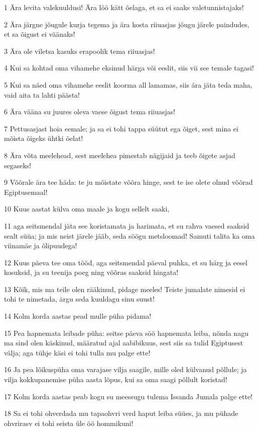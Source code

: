 \par 1 Ära levita valekuuldusi! Ära löö kätt õelaga, et sa ei saaks valetunnistajaks!
\par 2 Ära järgne jõugule kurja tegema ja ära kosta riiuasjas jõugu järele paindudes, et sa õigust ei väänaks!
\par 3 Ära ole viletsa kasuks erapoolik tema riiuasjas!
\par 4 Kui sa kohtad oma vihamehe eksinud härga või eeslit, siis vii see temale tagasi!
\par 5 Kui sa näed oma vihamehe eeslit koorma all lamamas, siis ära jäta teda maha, vaid aita ta lahti päästa!
\par 6 Ära vääna su juures oleva vaese õigust tema riiuasjas!
\par 7 Pettusasjast hoia eemale; ja sa ei tohi tappa süütut ega õiget, sest mina ei mõista õigeks ühtki õelat!
\par 8 Ära võta meelehead, sest meelehea pimestab nägijaid ja teeb õigete asjad segaseks!
\par 9 Võõrale ära tee häda: te ju mõistate võõra hinge, sest te ise olete olnud võõrad Egiptusemaal!
\par 10 Kuus aastat külva oma maale ja kogu sellelt saaki,
\par 11 aga seitsmendal jäta see koristamata ja harimata, et su rahva vaesed saaksid sealt süüa; ja mis neist järele jääb, seda söögu metsloomad! Samuti talita ka oma viinamäe ja õlipuudega!
\par 12 Kuus päeva tee oma tööd, aga seitsmendal päeval puhka, et su härg ja eesel kosuksid, ja su teenija poeg ning võõras saaksid hingata!
\par 13 Kõik, mis ma teile olen rääkinud, pidage meeles! Teiste jumalate nimesid ei tohi te nimetada, ärgu seda kuuldagu sinu suust!
\par 14 Kolm korda aastas pead mulle püha pidama!
\par 15 Pea hapnemata leibade püha: seitse päeva söö hapnemata leiba, nõnda nagu ma sind olen käskinud, määratud ajal aabibikuus, sest siis sa tulid Egiptusest välja; aga tühje käsi ei tohi tulla mu palge ette!
\par 16 Ja pea lõikuspüha oma varajase vilja saagile, mille oled külvanud põllule; ja vilja kokkupanemise püha aasta lõpus, kui sa oma saagi põllult koristad!
\par 17 Kolm korda aastas peab kogu su meessugu tulema Issanda Jumala palge ette!
\par 18 Sa ei tohi ohverdada mu tapaohvri verd haput leiba süües, ja mu pühade ohvrirasv ei tohi seista üle öö hommikuni!
